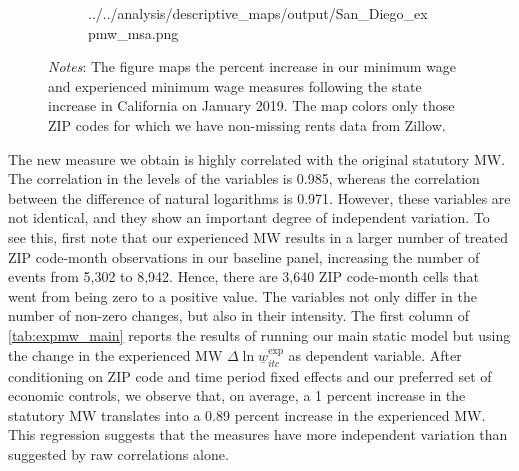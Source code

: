 \begin{figure}
\begin{subfigure}[b]{0.65\textwidth}
		{../../analysis/descriptive_maps/output/San_Diego_expmw_msa.png}
	\end{subfigure}
	\begin{minipage}{0.95\textwidth} \footnotesize
		\vspace{2mm} 
		\textit{Notes}: The figure maps the percent increase in our minimum wage and 
		experienced minimum wage measures following the state increase in California
		on January 2019. The map colors only those ZIP codes for which we have 
		non-missing rents data from Zillow.
	\end{minipage}
\end{figure}

The new measure we obtain is highly correlated with the original statutory MW. The 
correlation in the levels of the variables is 0.985, whereas the correlation between the 
difference of natural logarithms is 0.971. %
However, these variables are not identical, and they show an important degree of independent 
variation. To see this, first note that our experienced MW results in a larger number of 
treated ZIP code-month observations in our baseline panel, increasing the number of events 
from 5,302 to 8,942. %
Hence, there are 3,640 ZIP code-month cells that went from being zero to a positive value. 
The variables not only differ in the number of non-zero changes, but also in their intensity. 
The first column of \autoref{tab:expmw_main} reports the results of running our main static 
model but using the change in the experienced MW $\Delta \ln \underline{w}_{itc}^{\text{exp}}$ 
as dependent variable. After conditioning on ZIP code and time period fixed effects
and our preferred set of economic controls, we observe that, on average, a 1 percent increase 
in the statutory MW translates into a 0.89 percent increase in the experienced MW. This 
regression suggests that the measures have more independent variation than suggested by 
raw correlations alone.

